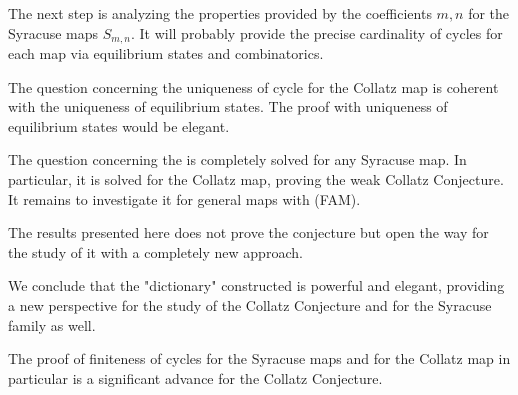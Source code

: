 \documentclass[12 pt]{amsart}
\theoremstyle{definition}
\begin{document}
	The next step is analyzing the properties provided by the coefficients $m, n$ for the Syracuse maps $S_{m,n}$. It will probably provide the precise cardinality of cycles for each map via equilibrium states and combinatorics.
	
	The question concerning the uniqueness of cycle for the Collatz map is coherent with the uniqueness of equilibrium states. The proof with uniqueness of equilibrium states would be elegant. 
	
	The question concerning the is completely solved for any Syracuse map. In particular, it is solved for the Collatz map, proving the weak Collatz Conjecture. It remains to investigate it for general maps with (FAM).

	The results presented here does not prove the conjecture but open the way for the study of it with a completely new approach. 
	
	We conclude that the "dictionary" constructed is powerful and elegant, providing a new perspective for the study of the Collatz Conjecture and for the Syracuse family as well.
	
	The proof of finiteness of cycles for the Syracuse maps and for the Collatz map in particular is a significant advance for the Collatz Conjecture.

\bigskip
\end{document}
